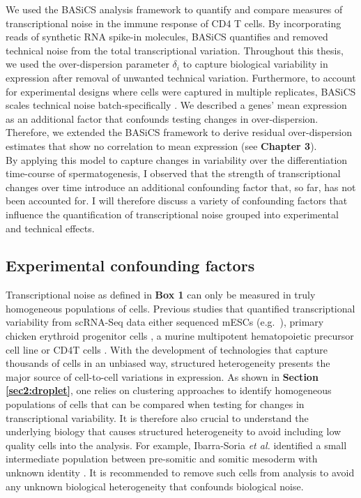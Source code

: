 We used the BASiCS analysis framework to quantify and compare measures of transcriptional noise in the immune response of CD4\plus{} T cells. By incorporating reads of synthetic RNA spike-in molecules, BASiCS quantifies and removed technical noise from the total transcriptional variation. Throughout this thesis, we used the over-dispersion parameter $\delta_i$ to capture biological variability in expression after removal of unwanted technical variation. Furthermore, to account for experimental designs where cells were captured in multiple replicates, BASiCS scales technical noise batch-specifically  \citep{Vallejos2015BASiCS}. We described a genes' mean expression as an additional factor that confounds testing changes in over-dispersion. Therefore, we extended the BASiCS framework to derive residual over-dispersion estimates that show no correlation to mean expression (see \textbf{Chapter 3}). \\

By applying this model to capture changes in variability over the differentiation time-course of spermatogenesis, I observed that the strength of transcriptional changes over time introduce an additional confounding factor that, so far, has not been accounted for. I will therefore discuss a variety of confounding factors that influence the quantification of transcriptional noise grouped into experimental and technical effects.

\subsection{Experimental confounding factors}

Transcriptional noise as defined in \textbf{Box 1} can only be measured in truly homogeneous populations of cells. Previous studies that quantified transcriptional variability from scRNA-Seq data either sequenced mESCs (e.g.~\citep{Kolodziejczyk2015cell}), primary chicken erythroid progenitor cells \citep{Richard2016}, a murine multipotent hematopoietic precursor cell line \citep{Mojtahedi2016} or CD4\plus T cells \citep{Martinez-jimenez2017}. With the development of technologies that capture thousands of cells in an unbiased way, structured heterogeneity presents the major source of cell-to-cell variations in expression. As shown in \textbf{Section \ref{sec2:droplet}}, one relies on clustering approaches to identify homogeneous populations of cells that can be compared when testing for changes in transcriptional variability. It is therefore also crucial to understand the underlying biology that causes structured heterogeneity to avoid including low quality cells into the analysis. For example, Ibarra-Soria \emph{et al.} identified a small intermediate population between pre-somitic and somitic mesoderm with unknown identity \citep{Ibarra-Soria2018}. It is recommended to remove such cells from analysis to avoid any unknown biological heterogeneity that confounds biological noise.

